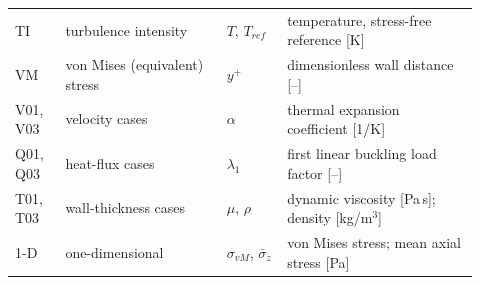 \begin{minipage}{\linewidth}
{\begin{tabular}{@{}p{0.10\linewidth}p{0.32\linewidth}p{0.12\linewidth}p{0.38\linewidth}@{}}
TI & turbulence intensity & $T$, $T_{ref}$ & temperature, stress-free reference [K] \\
VM & von Mises (equivalent) stress & $y^+$ & dimensionless wall distance [--] \\
V01, V03 & velocity cases & $\alpha$ & thermal expansion coefficient [1/K] \\
Q01, Q03 & heat-flux cases & $\lambda_1$ & first linear buckling load factor [--] \\
T01, T03 & wall-thickness cases & $\mu$, $\rho$ & dynamic viscosity [Pa\,s]; density [kg/m$^3$] \\
1-D & one-dimensional & $\sigma_{vM}$, $\bar\sigma_z$ & von Mises stress; mean axial stress [Pa] \\
\bottomrule
\end{tabular}}
\end{minipage}
